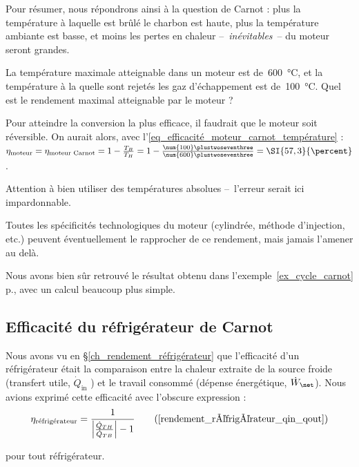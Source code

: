 		Pour résumer, nous répondrons ainsi à la question de Carnot : plus la température à laquelle est brûlé le charbon est haute, plus la température ambiante est basse, et moins les pertes en chaleur --\ \emph{inévitables}\ -- du moteur seront grandes.
		
		\onlyframabook{\clearpage}
		\begin{anexample}
		\label{ex_efficacite_moteur_carnot}
			La température maximale atteignable dans un moteur est de~\SI{600}{\degreeCelsius}, et la température à la quelle sont rejetés les gaz d’échappement est de~\SI{100}{\degreeCelsius}. Quel est le rendement maximal atteignable par le moteur ?
				\begin{answer}
					Pour atteindre la conversion la plus efficace, il faudrait que le moteur soit réversible. On aurait alors, avec l’\cref{eq_efficacité_moteur_carnot_température} : $\eta_\text{moteur} = \eta_\text{moteur Carnot} = 1 - \frac{T_B}{T_H} = 1 - \frac{\num{100}\plustwoseventhree}{\num{600}\plustwoseventhree} = \SI{57,3}{\percent}$.
					\begin{remark}Attention à bien utiliser des températures absolues --\ l’erreur serait ici impardonnable.\end{remark}
					\begin{remark}Toutes les spécificités technologiques du moteur (cylindrée, méthode d’injection, etc.) peuvent éventuellement le rapprocher de ce rendement, mais jamais l’amener au delà.\end{remark}
					\begin{remark}Nous avons bien sûr retrouvé le résultat obtenu dans l’exemple~\ref{ex_cycle_carnot} p.\pageref{ex_cycle_carnot}, avec un calcul beaucoup plus simple.\end{remark}
				\end{answer}
		\end{anexample}


	\subsection{Efficacité du réfrigérateur de Carnot}
	\label{ch_efficacite_refrigerateur_carnot}

		Nous avons vu en \S\ref{ch_rendement_réfrigérateur} que l’efficacité d’un réfrigérateur était la comparaison entre la chaleur extraite de la source froide (transfert utile, $\dot Q_\text{in}$ ) et le travail consommé (dépense énergétique, $\dot W_\net$).  Nous avions exprimé cette efficacité avec l’obscure expression :
		\begin{equation}
			\eta_\text{réfrigérateur} = \frac{1}{ \left| \frac{\dot Q_{TH}}{\dot Q_{TB}} \right| - 1} \tag{\ref{rendement_réfrigérateur_qin_qout}}
		\end{equation}
		\begin{equationterms}
			\item pour tout réfrigérateur.
		\end{equationterms}

